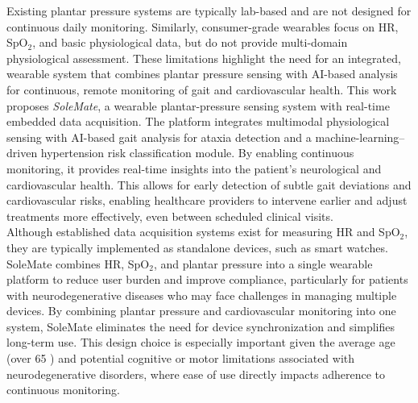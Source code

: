 Existing plantar pressure systems are typically lab-based and are not designed for continuous daily monitoring. Similarly, consumer-grade wearables focus on HR, SpO$_2$, and basic physiological data, but do not provide multi-domain physiological assessment. These limitations highlight the need for an integrated, wearable system that combines plantar pressure sensing with AI-based analysis for continuous, remote monitoring of gait and cardiovascular health. This work proposes \textit{SoleMate}, a wearable plantar-pressure sensing system with real-time embedded data acquisition. The platform integrates multimodal physiological sensing with AI-based gait analysis for ataxia detection and a machine-learning–driven hypertension risk classification module. By enabling continuous monitoring, it provides real-time insights into the patient’s neurological and cardiovascular health. This allows for early detection of subtle gait deviations and cardiovascular risks, enabling healthcare providers to intervene earlier and adjust treatments more effectively, even between scheduled clinical visits.\\

Although established data acquisition systems exist for measuring HR and SpO$_2$, they are typically implemented as standalone devices, such as smart watches. SoleMate combines HR, SpO$_2$, and plantar pressure into a single wearable platform to reduce user burden and improve compliance, particularly for patients with neurodegenerative diseases who may face challenges in managing multiple devices. By combining plantar pressure and cardiovascular monitoring into one system, SoleMate eliminates the need for device synchronization and simplifies long-term use. This design choice is especially important given the average age (over 65 \cite{cleveland2026neurodegenerative}) and potential cognitive or motor limitations associated with neurodegenerative disorders, where ease of use directly impacts adherence to continuous monitoring.\\



